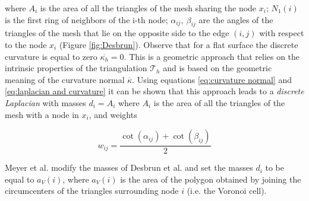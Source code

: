 where $A_i$ is the area of all the triangles of the mesh sharing the node $x_i$; $N_1(i)$ is the first ring of neighbors of the i-th node; $\alpha_{i j},\ \beta_{i j}$ are the angles of the triangles of the mesh that lie on the opposite side to the edge $(i,j)$ with respect to the node $x_i$ (Figure \ref{fig:Desbrun}). Observe that for a flat surface the discrete curvature is equal to zero $\overline{\kappa_h}=0$. This is a geometric approach that relies on the intrinsic properties of the triangulation $\mathcal T_h$ and is based on the geometric meaning of the curvature normal $\overline{\kappa}$. Using equations \ref{eq:curvature normal} and \ref{eq:laplacian and curvature} it can be shown \cite{REUTER2009381} that this approach leads to a \textit{discrete Laplacian} with masses $d_i=A_i$ where $A_i$ is the area of all the triangles of the mesh with a node in $x_i$, and weights

$$w_{i j}=\frac{\cot \left(\alpha_{i j}\right)+\cot \left(\beta_{i j}\right)}{2}$$

Meyer et al. \cite{Meyer02discretedifferential-geometry} modify the masses of Desbrun et al. and set the masses $d_i$ to be equal to $a_{V}(i)$, where \(a_{V}(i)\) is the area of the polygon obtained by joining the circumcenters of the triangles surrounding node $i$ (i.e. the Voronoi cell).


